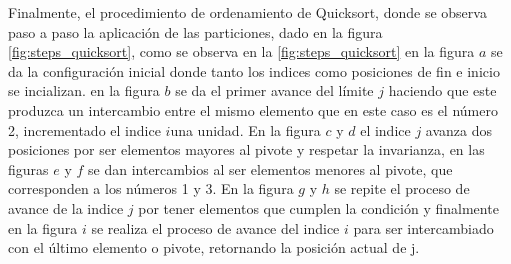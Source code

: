 \documentclass{article}
\begin{document}
                    Finalmente, el procedimiento de ordenamiento de Quicksort, donde se observa paso a paso la aplicaci\'{o}n de las particiones, dado en la figura \ref{fig:steps_quicksort}, como se observa en la \ref{fig:steps_quicksort} en la figura $a$ se da la configuraci\'{o}n inicial donde tanto los indices como posiciones de fin e inicio se incializan. en la figura $b$ se da el primer avance del l\'{i}mite $j$ haciendo que este produzca un intercambio entre el mismo elemento que en este caso es el n\'{u}mero 2, incrementado el indice $i$una unidad. En la figura $c$ y $d$ el indice $j$ avanza dos posiciones por ser elementos mayores al pivote y respetar la invarianza, en las figuras $e$ y $f$ se dan intercambios al ser elementos menores al pivote, que corresponden a los n\'{u}meros 1 y 3. En la figura $g$ y $h$ se repite el proceso de avance de la indice $j$ por tener elementos que cumplen la condici\'{o}n y finalmente en la figura $i$ se realiza el proceso de avance del indice $i$ para ser intercambiado con el \'{u}ltimo elemento o pivote, retornando la posici\'{o}n actual de j.
\end{document}
